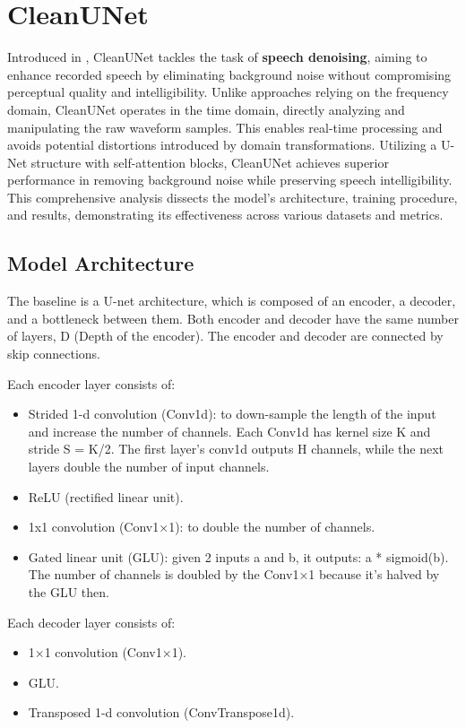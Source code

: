 \section{CleanUNet}
Introduced in \cite{kong2022}, CleanUNet tackles the task of \textbf{speech denoising}, aiming to enhance recorded speech by eliminating background noise without compromising perceptual quality and intelligibility. Unlike approaches relying on the frequency domain, CleanUNet operates in the time domain, directly analyzing and manipulating the raw waveform samples. This enables real-time processing and avoids potential distortions introduced by domain transformations. Utilizing a U-Net structure with self-attention blocks, CleanUNet achieves superior performance in removing background noise while preserving speech intelligibility. This comprehensive analysis dissects the model's architecture, training procedure, and results, demonstrating its effectiveness across various datasets and metrics.

\subsection{Model Architecture}
The baseline is a U-net architecture, which is composed of an encoder, a decoder, and a bottleneck between them. Both encoder and decoder have the same number of layers, D (Depth of the encoder). The encoder and decoder are connected by skip connections.

Each encoder layer consists of:
\begin{itemize}
    \item Strided 1-d convolution (Conv1d): to down-sample the length of the input and increase the number of channels. Each Conv1d has kernel size K and stride S = K/2. The first layer's conv1d outputs H channels, while the next layers double the number of input channels.
    \item ReLU (rectified linear unit).
    \item 1x1 convolution (Conv1×1): to double the number of channels.
    \item Gated linear unit (GLU): given 2 inputs a and b, it outputs: a * sigmoid(b). The number of channels is doubled by the Conv1×1 because it's halved by the GLU then.
\end{itemize}

Each decoder layer consists of:
\begin{itemize}
    \item 1×1 convolution (Conv1×1).
    \item GLU.
    \item Transposed 1-d convolution (ConvTranspose1d).
\end{itemize}

